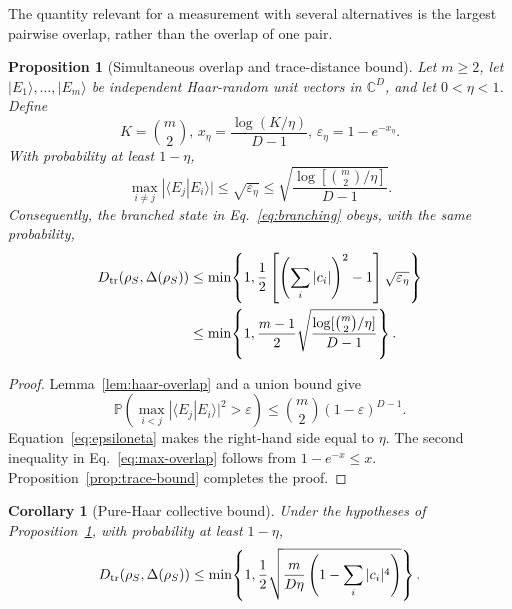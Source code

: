 \documentclass[aps,pra,reprint,superscriptaddress,nofootinbib,longbibliography]{revtex4-2}
\newtheorem{proposition}{Proposition}
\newtheorem{corollary}{Corollary}
\newcommand{\ket}[1]{| #1 \rangle}
\newcommand{\eps}{\varepsilon}
\newcommand{\PP}{\mathbb{P}}
\begin{document}
The quantity relevant for a measurement with several alternatives is the
largest pairwise overlap, rather than the overlap of one pair.

\begin{proposition}[Simultaneous overlap and trace-distance bound]
\label{prop:simultaneous}
Let $m\geq2$, let $\ket{E_1},\ldots,\ket{E_m}$ be independent Haar-random
unit vectors in $\mathbb C^D$, and let $0<\eta<1$.  Define
\begin{equation}
 K=\binom{m}{2},\,
 x_\eta=\frac{\log(K/\eta)}{D-1},\,
 \eps_\eta=1-e^{-x_\eta}.
 \label{eq:epsiloneta}
\end{equation}
With probability at least $1-\eta$,
\begin{equation}
 \max_{i\neq j}|\langle E_j|E_i\rangle|
 \leq\sqrt{\eps_\eta}
 \leq
 \sqrt{\frac{\log[\binom{m}{2}/\eta]}{D-1}}.
 \label{eq:max-overlap}
\end{equation}
Consequently, the branched state in Eq.~\eqref{eq:branching} obeys, with the
same probability,
\begin{align}
 D_{\rm tr}\!\left(\rho_S,\Delta(\rho_S)\right)
 &\leq
 \min\!\left\{1,
 \frac12\left[\left(\sum_i|c_i|\right)^2-1\right]
 \sqrt{\eps_\eta}\right\}
 \nonumber\\
 &\leq
 \min\!\left\{1,
 \frac{m-1}{2}
 \sqrt{\frac{\log[\binom{m}{2}/\eta]}{D-1}}\right\}.
 \label{eq:prob-trace-bound}
\end{align}
\end{proposition}

\begin{proof}
Lemma~\ref{lem:haar-overlap} and a union bound give
\begin{equation}
 \PP\!\left(\max_{i<j}|\langle E_j|E_i\rangle|^2>\eps\right)
 \leq\binom{m}{2}(1-\eps)^{D-1}.
\end{equation}
Equation~\eqref{eq:epsiloneta} makes the right-hand side equal to $\eta$.
The second inequality in Eq.~\eqref{eq:max-overlap} follows from
$1-e^{-x}\leq x$.  Proposition~\ref{prop:trace-bound} completes the proof.
\end{proof}

\begin{corollary}[Pure-Haar collective bound]
\label{cor:pure-haar-collective}
Under the hypotheses of Proposition~\ref{prop:simultaneous}, with probability
at least $1-\eta$,
\begin{equation}
 D_{\rm tr}\!\left(\rho_S,\Delta(\rho_S)\right)
 \leq
 \min\!\left\{1,
 \frac12\sqrt{
 \frac{m}{D\eta}
 \left(1-\sum_i|c_i|^4\right)}\right\}.
 \label{eq:pure-haar-collective}
\end{equation}
\end{corollary}
\end{document}
